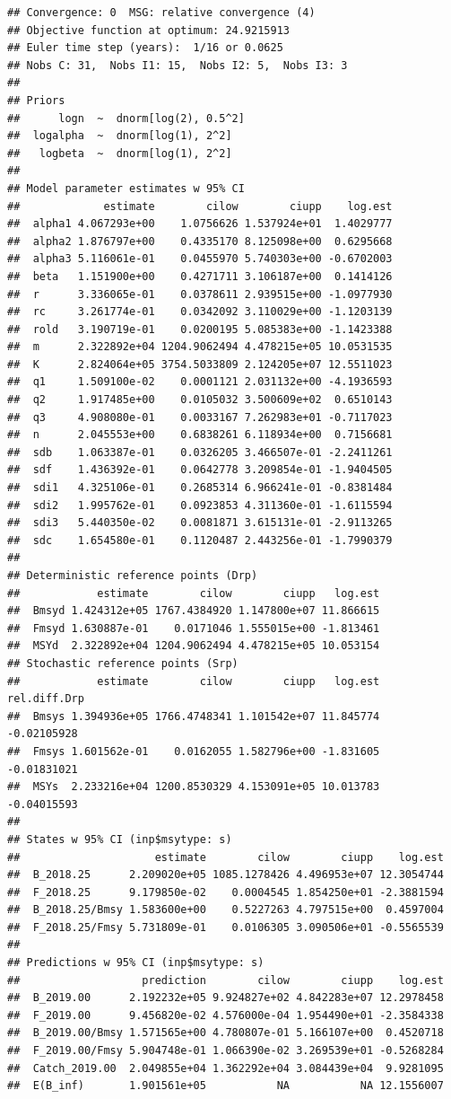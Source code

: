 \documentclass[
]{article}
\begin{document}
\begin{verbatim}
## Convergence: 0  MSG: relative convergence (4)
## Objective function at optimum: 24.9215913
## Euler time step (years):  1/16 or 0.0625
## Nobs C: 31,  Nobs I1: 15,  Nobs I2: 5,  Nobs I3: 3
## 
## Priors
##      logn  ~  dnorm[log(2), 0.5^2]
##  logalpha  ~  dnorm[log(1), 2^2]
##   logbeta  ~  dnorm[log(1), 2^2]
## 
## Model parameter estimates w 95% CI 
##             estimate        cilow        ciupp    log.est  
##  alpha1 4.067293e+00    1.0756626 1.537924e+01  1.4029777  
##  alpha2 1.876797e+00    0.4335170 8.125098e+00  0.6295668  
##  alpha3 5.116061e-01    0.0455970 5.740303e+00 -0.6702003  
##  beta   1.151900e+00    0.4271711 3.106187e+00  0.1414126  
##  r      3.336065e-01    0.0378611 2.939515e+00 -1.0977930  
##  rc     3.261774e-01    0.0342092 3.110029e+00 -1.1203139  
##  rold   3.190719e-01    0.0200195 5.085383e+00 -1.1423388  
##  m      2.322892e+04 1204.9062494 4.478215e+05 10.0531535  
##  K      2.824064e+05 3754.5033809 2.124205e+07 12.5511023  
##  q1     1.509100e-02    0.0001121 2.031132e+00 -4.1936593  
##  q2     1.917485e+00    0.0105032 3.500609e+02  0.6510143  
##  q3     4.908080e-01    0.0033167 7.262983e+01 -0.7117023  
##  n      2.045553e+00    0.6838261 6.118934e+00  0.7156681  
##  sdb    1.063387e-01    0.0326205 3.466507e-01 -2.2411261  
##  sdf    1.436392e-01    0.0642778 3.209854e-01 -1.9404505  
##  sdi1   4.325106e-01    0.2685314 6.966241e-01 -0.8381484  
##  sdi2   1.995762e-01    0.0923853 4.311360e-01 -1.6115594  
##  sdi3   5.440350e-02    0.0081871 3.615131e-01 -2.9113265  
##  sdc    1.654580e-01    0.1120487 2.443256e-01 -1.7990379  
##  
## Deterministic reference points (Drp)
##            estimate        cilow        ciupp   log.est  
##  Bmsyd 1.424312e+05 1767.4384920 1.147800e+07 11.866615  
##  Fmsyd 1.630887e-01    0.0171046 1.555015e+00 -1.813461  
##  MSYd  2.322892e+04 1204.9062494 4.478215e+05 10.053154  
## Stochastic reference points (Srp)
##            estimate        cilow        ciupp   log.est rel.diff.Drp  
##  Bmsys 1.394936e+05 1766.4748341 1.101542e+07 11.845774  -0.02105928  
##  Fmsys 1.601562e-01    0.0162055 1.582796e+00 -1.831605  -0.01831021  
##  MSYs  2.233216e+04 1200.8530329 4.153091e+05 10.013783  -0.04015593  
## 
## States w 95% CI (inp$msytype: s)
##                     estimate        cilow        ciupp    log.est  
##  B_2018.25      2.209020e+05 1085.1278426 4.496953e+07 12.3054744  
##  F_2018.25      9.179850e-02    0.0004545 1.854250e+01 -2.3881594  
##  B_2018.25/Bmsy 1.583600e+00    0.5227263 4.797515e+00  0.4597004  
##  F_2018.25/Fmsy 5.731809e-01    0.0106305 3.090506e+01 -0.5565539  
## 
## Predictions w 95% CI (inp$msytype: s)
##                   prediction        cilow        ciupp    log.est  
##  B_2019.00      2.192232e+05 9.924827e+02 4.842283e+07 12.2978458  
##  F_2019.00      9.456820e-02 4.576000e-04 1.954490e+01 -2.3584338  
##  B_2019.00/Bmsy 1.571565e+00 4.780807e-01 5.166107e+00  0.4520718  
##  F_2019.00/Fmsy 5.904748e-01 1.066390e-02 3.269539e+01 -0.5268284  
##  Catch_2019.00  2.049855e+04 1.362292e+04 3.084439e+04  9.9281095  
##  E(B_inf)       1.901561e+05           NA           NA 12.1556007
\end{verbatim}
\end{document}
